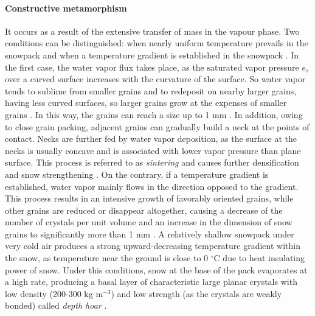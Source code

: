 \paragraph{Constructive metamorphism} It occurs as a result of the extensive transfer of mass in the vapour phase. Two conditions can be distinguished: when nearly uniform temperature prevails in the snowpack and when a temperature gradient is established in the snowpack \citep{Singh01}. In the first case, the water vapor flux takes place, as the saturated vapor pressure $e_s$ over a curved surface increases with the curvature of the surface.
So water vapor tends to sublime from smaller grains and to redeposit on nearby larger grains, having less curved surfaces, so larger grains grow at the expenses of smaller grains \citep{Dingman1994}. In this way, the grains can reach a size up to 1 mm \citep{Sommer70}. In addition, owing to close grain packing, adjacent grains can gradually build a neck at the points of contact. Necks are further fed by water vapor deposition, as the surface at the necks is usually concave and is associated with lower vapor pressure than plane surface.
This process is referred to as \emph{sintering} and causes further densification and snow strengthening \citep{Singh01}. On the contrary, if a temperature gradient is established, water vapor mainly flows in the direction opposed to the gradient. This process results in an intensive growth of favorably oriented grains, while other grains are reduced or disappear altogether, causing a decrease of the number of crystals per unit volume and an increase in the dimension of snow grains \citep{Singh01} to significantly more than 1 mm \citep{Alford74}. A relatively shallow snowpack under very cold air produces a strong upward-decreasing temperature gradient within the snow, as temperature near the ground is close to  0 $^\circ$C due to heat insulating power of snow. Under this conditions, snow at the base of the pack evaporates at a high rate, producing a basal layer of characteristic large planar crystals with low density (200-300 kg m$^{-3}$) and low strength (as the crystals are weakly bonded) called \emph{depth hoar} \citep{Singh01}.

